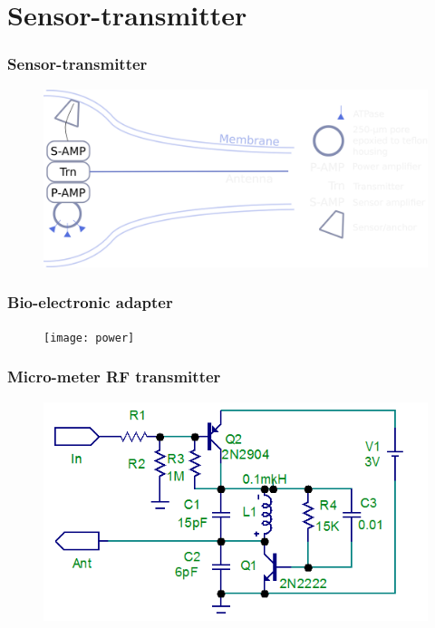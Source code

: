 \documentclass[12pt]{beamer}
\begin{document}
\section{Sensor-transmitter}

\begin{frame}
\frametitle{Sensor-transmitter}
\begin{figure}
\includegraphics[width=1.0\linewidth]{cellCircuit_transmitter}
\end{figure}
\end{frame}



\begin{frame}
\frametitle{Bio-electronic adapter}
\begin{figure}
\texttt{[image: power]}
\end{figure}
\end{frame}



\begin{frame}
\frametitle{Micro-meter RF transmitter}
\begin{figure}
\includegraphics[width=0.8\linewidth]{transmitter}
\end{figure}
\end{frame}
\end{document}
